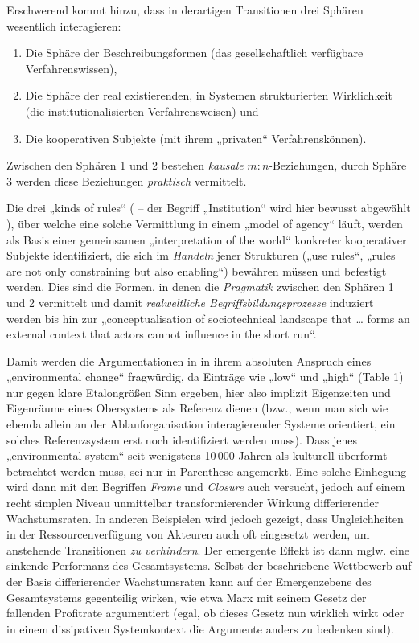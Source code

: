 \documentclass[11pt,a4paper]{article}
\begin{document}
Erschwerend kommt hinzu, dass in derartigen Transitionen drei Sphären
wesentlich interagieren:
\begin{enumerate}[noitemsep]
\item Die Sphäre der Beschreibungsformen (das gesellschaftlich verfügbare
  Verfahrenswissen),
\item Die Sphäre der real existierenden, in Systemen strukturierten
  Wirklichkeit (die institutionalisierten Verfahrensweisen) und
\item Die kooperativen Subjekte (mit ihrem „privaten“ Verfahrenskönnen).
\end{enumerate}
Zwischen den Sphären 1 und 2 bestehen \emph{kausale} $m:n$-Beziehungen, durch
Sphäre 3 werden diese Beziehungen \emph{praktisch} vermittelt.

Die drei „kinds of rules“ (\cite[3.3.]{Geels2007} -- der Begriff „Institution“
wird hier bewusst abgewählt \cite[S. 403, Fußnote 1]{Geels2007}), über welche
eine solche Vermittlung in einem „model of agency“ läuft, werden als Basis
einer gemeinsamen „interpretation of the world“ konkreter kooperativer
Subjekte identifiziert, die sich im \emph{Handeln} jener Strukturen („use
rules“, „rules are not only constraining but also enabling“) bewähren müssen
und befestigt werden. Dies sind die Formen, in denen die \emph{Pragmatik}
zwischen den Sphären 1 und 2 vermittelt und damit \emph{realweltliche
  Begriffsbildungsprozesse} induziert werden bis hin zur „conceptualisation of
sociotechnical landscape that \ldots{} forms an external context that actors
cannot influence in the short run“.

Damit werden die Argumentationen in \cite[Fig. 4 und Table 1]{Geels2007} in
ihrem absoluten Anspruch eines „environmental change“ fragwürdig, da Einträge
wie „low“ und „high“ (Table 1) nur gegen klare Etalongrößen Sinn ergeben, hier
also implizit Eigenzeiten und Eigenräume eines Obersystems als Referenz dienen
(bzw., wenn man sich wie ebenda allein an der Ablauforganisation
interagierender Systeme orientiert, ein solches Referenzsystem erst noch
identifiziert werden muss). Dass jenes „environmental system“ seit wenigstens
10\,000 Jahren als kulturell überformt betrachtet werden muss, sei nur in
Parenthese angemerkt. Eine solche Einhegung wird dann mit den Begriffen
\emph{Frame} und \emph{Closure} \cite[S. 405]{Geels2007} auch versucht, jedoch
auf einem recht simplen Niveau unmittelbar transformierender Wirkung
differierender Wachstumsraten. In anderen Beispielen wird jedoch gezeigt, dass
Ungleichheiten in der Ressourcenverfügung von Akteuren auch oft eingesetzt
werden, um anstehende Transitionen \emph{zu verhindern}. Der emergente Effekt
ist dann mglw. eine sinkende Performanz des Gesamtsystems. Selbst der
beschriebene Wettbewerb auf der Basis differierender Wachstumsraten kann auf
der Emergenz\-ebene des Gesamtsystems gegenteilig wirken, wie etwa Marx mit
seinem Gesetz der fallenden Profitrate argumentiert (egal, ob dieses Gesetz
nun wirklich wirkt oder in einem dissipativen Systemkontext die Argumente
anders zu bedenken sind).
\end{document}
